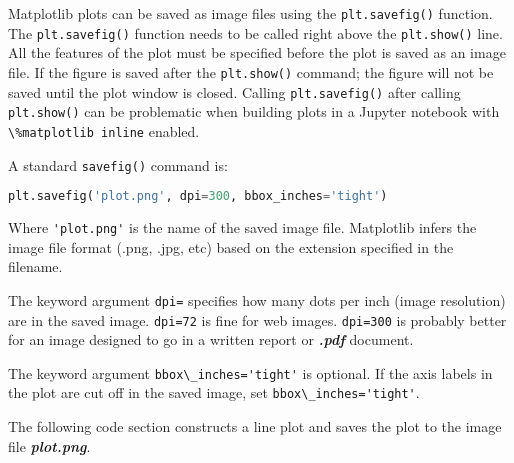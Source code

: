\documentclass{book}
\newcommand{\passthrough}[1]{#1}
\begin{document}
    
        Matplotlib plots can be saved as image files using the
\passthrough{\lstinline!plt.savefig()!} function. The
\passthrough{\lstinline!plt.savefig()!} function needs to be called
right above the \passthrough{\lstinline!plt.show()!} line. All the
features of the plot must be specified before the plot is saved as an
image file. If the figure is saved after the
\passthrough{\lstinline!plt.show()!} command; the figure will not be
saved until the plot window is closed. Calling
\passthrough{\lstinline!plt.savefig()!} after calling
\passthrough{\lstinline!plt.show()!} can be problematic when building
plots in a Jupyter notebook with
\passthrough{\lstinline!\%matplotlib inline!} enabled.

A standard \passthrough{\lstinline!savefig()!} command is:

\begin{lstlisting}[language=Python]
plt.savefig('plot.png', dpi=300, bbox_inches='tight')
\end{lstlisting}

Where \passthrough{\lstinline!'plot.png'!} is the name of the saved
image file. Matplotlib infers the image file format (.png, .jpg, etc)
based on the extension specified in the filename.

The keyword argument \passthrough{\lstinline!dpi=!} specifies how many
dots per inch (image resolution) are in the saved image.
\passthrough{\lstinline!dpi=72!} is fine for web images.
\passthrough{\lstinline!dpi=300!} is probably better for an image
designed to go in a written report or \textbf{\emph{.pdf}} document.

The keyword argument \passthrough{\lstinline!bbox\_inches='tight'!} is
optional. If the axis labels in the plot are cut off in the saved image,
set \passthrough{\lstinline!bbox\_inches='tight'!}.

The following code section constructs a line plot and saves the plot to
the image file \textbf{\emph{plot.png}}.
    
\end{document}

